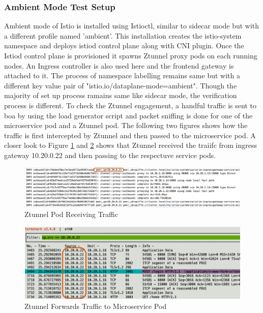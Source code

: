 \subsubsection{Ambient Mode Test Setup}
Ambient mode of Istio is installed using Istioctl, similar to sidecar mode but with a different profile named 'ambient'. This installation creates the istio-system namespace and deploys istiod control plane along with CNI plugin. Once the Istiod control plane is provisioned it spawns Ztunnel proxy pods on each running nodes. An Ingress controller is also used here and the frontend gateway is attached to it. The process of namespace labelling remains same but with a different key value pair of "istio.io/dataplane-mode=ambient". Though the majority of set up process ramains same like sidecar mode, the verification process is different. To check the Ztunnel engagement, a handful traffic is sent to \acrshort{boa} by using the load generator script and packet sniffing is done for one of the microservice pod and a Ztunnel pod. The following two figures shows how the traffic is first intercepted by Ztunnel and then passed to the microservice pod. A closer look to Figure \ref{method:ztunnelLogView} and \ref{method:ztunnelTraceView} shows that Ztunnel received the traiifc from ingress gateway 10.20.0.22 and then passing to the respectuve service pods.

\begin{figure}[ht!]
    \centering
    \includegraphics[width=1.0\linewidth]{resources/ztunnel-log.png}
    \caption{Ztunnel Pod Receiving Traffic}
    \label{method:ztunnelLogView}
\end{figure}

\begin{figure}[ht!]
    \centering
    \includegraphics[width=1.0\linewidth]{resources/ztunnel-network-trace.png}
    \caption{Ztunnel Forwards Traffic to Microservice Pod}
    \label{method:ztunnelTraceView}
\end{figure}

